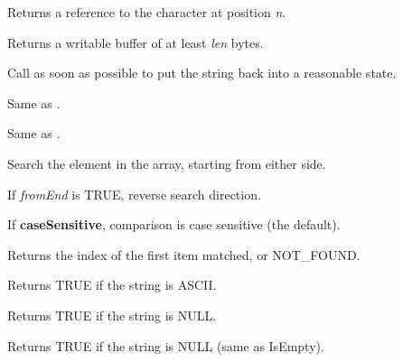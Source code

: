 
Returns a reference to the character at position {\it n}.

\label{wxstringgetwritebuf}


Returns a writable buffer of at least {\it len} bytes.

Call  as soon as possible
to put the string back into a reasonable state.

\label{wxstringindex}


Same as .


Same as .


Search the element in the array, starting from either side.

If {\it fromEnd} is TRUE, reverse search direction.

If {\bf caseSensitive}, comparison is case sensitive (the default).

Returns the index of the first item matched, or NOT\_FOUND.

%
%
\label{wxstringisascii}


Returns TRUE if the string is ASCII.

\label{wxstringisempty}


Returns TRUE if the string is NULL.

\label{wxstringisnull}


Returns TRUE if the string is NULL (same as IsEmpty).

